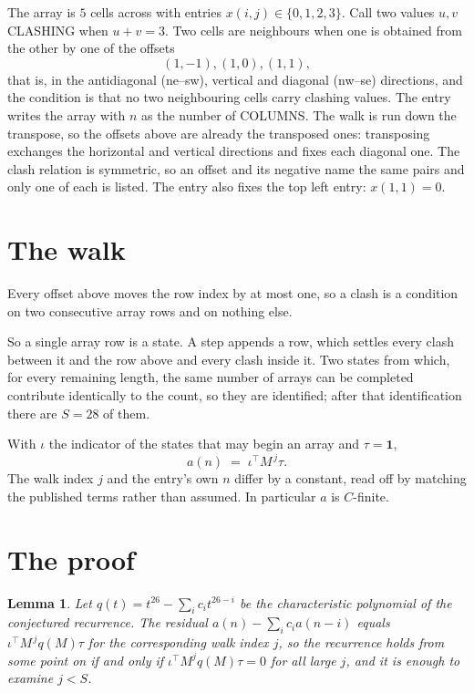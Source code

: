 \documentclass[11pt,a4paper]{article}
\theoremstyle{plain}
\newtheorem{lemma}[theorem]{Lemma}
\theoremstyle{definition}
\begin{document}
The array is $5$ cells across with entries $x(i,j)\in\{0,1,2,3\}$. Call two values $u,v$ CLASHING
when $u+v=3$. Two cells are neighbours when one is obtained from the other by one of
the offsets
\[
(1,-1), (1,0), (1,1),
\]
that is, in the antidiagonal (ne--sw), vertical and diagonal (nw--se) directions, and the condition is that no two neighbouring cells carry
clashing values. The entry writes the array with $n$ as the number of COLUMNS. The walk is run down the transpose, so the offsets above are already the transposed ones: transposing exchanges the horizontal and vertical directions and fixes each diagonal one. The clash relation is symmetric, so an offset and its negative name the
same pairs and only one of each is listed. The entry also fixes the top left entry: $x(1,1)=0$.

\section{The walk}

Every offset above moves the row index by at most one, so a clash is a condition on two
consecutive array rows and on nothing else.

So a single array row is a state. A step appends a row, which settles every clash between it
and the row above and every clash inside it. Two states from which, for every remaining length,
the same number of arrays can be completed contribute identically to the count, so they are
identified; after that identification there are $S=28$ of them.

With $\iota$ the indicator of the states that may begin an array and $\tau=\mathbf{1}$,
\[
a(n)\;=\;\iota^{\!\top}M^{\,j}\tau .
\]
The walk index $j$ and the entry's own $n$ differ by a constant, read off by matching the
published terms rather than assumed. In particular $a$ is $C$-finite.

\section{The proof}

\begin{lemma}\label{lem:crit}
Let $q(t)=t^{26}-\sum_i c_it^{26-i}$ be the characteristic polynomial of the
conjectured recurrence. The residual $a(n)-\sum_ic_ia(n-i)$ equals
$\iota^{\!\top}M^{\,j}q(M)\tau$ for the corresponding walk index $j$, so the recurrence
holds from some point on if and only if $\iota^{\!\top}M^{j}q(M)\tau=0$ for all large $j$,
and it is enough to examine $j<S$.
\end{lemma}
\end{document}
